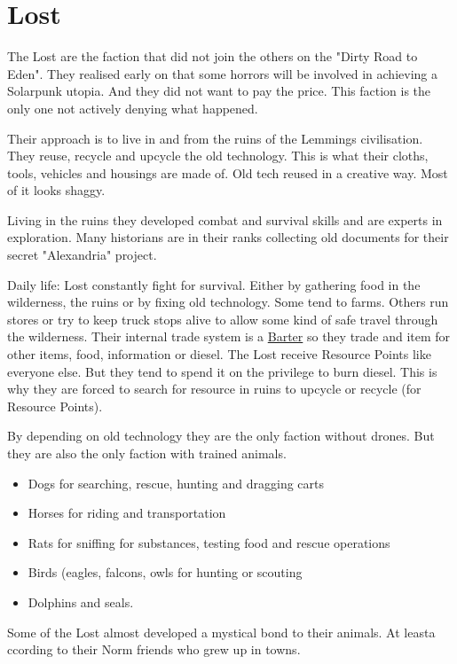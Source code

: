 \section{Lost}

The Lost are the faction that did not join the others on the "Dirty Road to Eden". They realised early on that some horrors will be involved in achieving a Solarpunk utopia. And they did not want to pay the price. This faction is the only one not actively denying what happened.

Their approach is to live in and from the ruins of the Lemmings civilisation. They reuse, recycle and upcycle the old technology. This is what their cloths, tools, vehicles and housings are made of. Old tech reused in a creative way. Most of it looks shaggy.

Living in the ruins they developed combat and survival skills and are experts in exploration.
Many historians are in their ranks collecting old documents for their secret "Alexandria" project.

Daily life: Lost constantly fight for survival. Either by gathering food in the wilderness, the ruins or by fixing old technology. Some tend to farms. Others run stores or try to keep truck stops alive to allow some kind of safe travel through the wilderness. Their internal trade system is a \hyperref[sec:Barter]{Barter} so they trade and item for other items, food, information or diesel.
The Lost receive Resource Points like everyone else. But they tend to spend it on the privilege to burn diesel. This is why they are forced to search for resource in ruins to upcycle or recycle (for Resource Points).

By depending on old technology they are the only faction without drones. But they are also the only faction with trained animals.

\begin{itemize}
    \item Dogs for searching, rescue, hunting and dragging carts
    \item Horses for riding and transportation
    \item Rats for sniffing for substances, testing food and rescue operations
    \item Birds (eagles, falcons, owls for hunting or scouting
    \item Dolphins and seals.
\end{itemize}

Some of the Lost almost developed a mystical bond to their animals. At leasta ccording to their Norm friends who grew up in towns.

